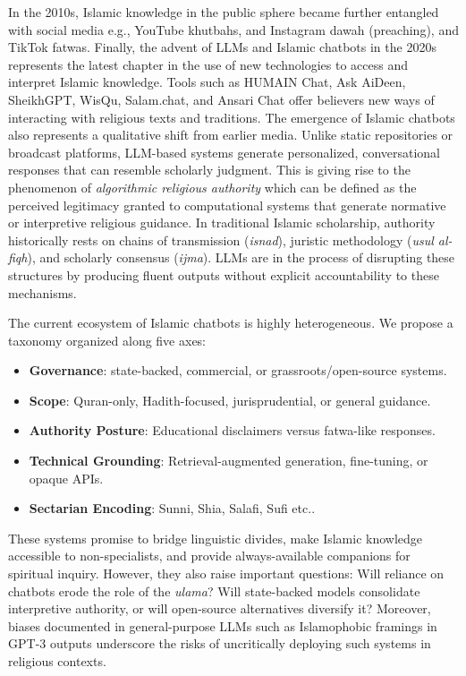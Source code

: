 \documentclass{article}
\begin{document}
In the 2010s, Islamic knowledge in the public sphere became further entangled with social media e.g., YouTube khutbahs, and Instagram dawah (preaching), and TikTok fatwas. Finally, the advent of LLMs and Islamic chatbots in the 2020s represents the latest chapter in the use of new technologies to access and interpret Islamic knowledge. Tools such as HUMAIN Chat, Ask AiDeen, SheikhGPT, WisQu, Salam.chat, and Ansari Chat offer believers new ways of interacting with religious texts and traditions. The emergence of Islamic chatbots also represents a qualitative shift from earlier media. Unlike static repositories or broadcast platforms, LLM-based systems generate personalized, conversational responses that can resemble scholarly judgment. This is giving rise to the phenomenon of \emph{algorithmic religious authority} which can be defined as the perceived legitimacy granted to computational systems that generate normative or interpretive religious guidance. In traditional Islamic scholarship, authority historically rests on chains of transmission (\emph{isnad}), juristic methodology (\emph{usul al-fiqh}), and scholarly consensus (\emph{ijma}). LLMs are in the process of disrupting these structures by producing fluent outputs without explicit accountability to these mechanisms. 

The current ecosystem of Islamic chatbots is highly heterogeneous. We propose a taxonomy organized along five axes:

\begin{itemize}
\item \textbf{Governance}: state-backed, commercial, or grassroots/open-source systems.
\item \textbf{Scope}: Quran-only, Hadith-focused, jurisprudential, or general guidance.
\item \textbf{Authority Posture}: Educational disclaimers versus fatwa-like responses.
\item \textbf{Technical Grounding}: Retrieval-augmented generation, fine-tuning, or opaque APIs.
\item \textbf{Sectarian Encoding}: Sunni, Shia, Salafi, Sufi etc..
\end{itemize}

These systems promise to bridge linguistic divides, make Islamic knowledge accessible to non-specialists, and provide always-available companions for spiritual inquiry. However, they also raise important questions: Will reliance on chatbots erode the role of the \textit{ulama}? Will state-backed models consolidate interpretive authority, or will open-source alternatives diversify it? Moreover, biases documented in general-purpose LLMs such as Islamophobic framings in GPT-3 outputs \citep{abid2021} underscore the risks of uncritically deploying such systems in religious contexts.
\end{document}
